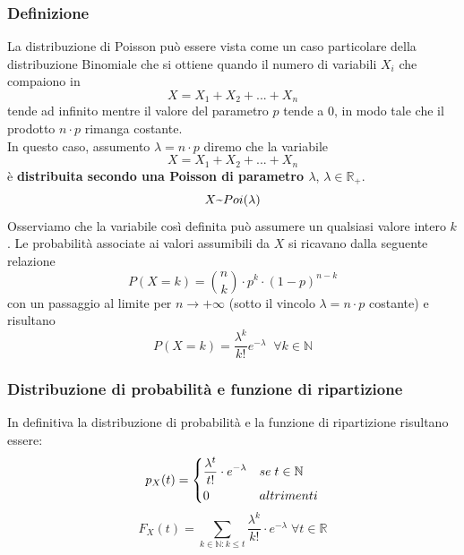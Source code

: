 \subsubsection{Definizione}
La distribuzione di Poisson può essere vista come un caso particolare della distribuzione Binomiale che si ottiene quando il numero di variabili $X_i$ che compaiono in 
\[
X = X_1 + X_2 + ... + X_n
\]
tende ad infinito mentre il valore del parametro $p$ tende a 0, in modo tale che il prodotto $n \cdot p$ rimanga costante.\\
In questo caso, assumento $\lambda = n \cdot p$ diremo che la variabile \[X = X_1 + X_2 + ... + X_n\] è \textbf{distribuita secondo una Poisson di parametro $\lambda$}, $\lambda \in \mathbb{R}_+$.
\[
X \textapprox Poi(\lambda)
\]
Osserviamo che la variabile così definita può assumere un qualsiasi valore intero $k$. Le probabilità associate ai valori assumibili da $X$ si ricavano dalla seguente relazione
\begin{equation*}
P(X = k) = \binom{n}{k} \cdot p^k \cdot (1-p)^{n-k}
\end{equation*}
con un passaggio al limite per $n \to +\infty$ (sotto il vincolo $\lambda = n \cdot p$ costante) e risultano
\begin{equation}
	P(X = k) = \frac{\lambda^k}{k!}e^{-\lambda} \; \; \forall k \in \mathbb{N}
\end{equation}

\subsubsection{Distribuzione di probabilità e funzione di ripartizione}
In definitiva la distribuzione di probabilità e la funzione di ripartizione risultano essere:
\begin{equation}
	p_X(t) = 
	\begin{dcases}
		\frac{\lambda^t}{t!}\cdot e^{-\lambda} & se \; t \in \mathbb{N} \\
		0 & altrimenti
	\end{dcases}
\end{equation}
\begin{equation}
	F_X(t) = \sum_{k \in \mathbb{N}: k \le t} \frac{\lambda^k}{k!} \cdot e^{-\lambda} \; \forall t \in \mathbb{R}
\end{equation}

